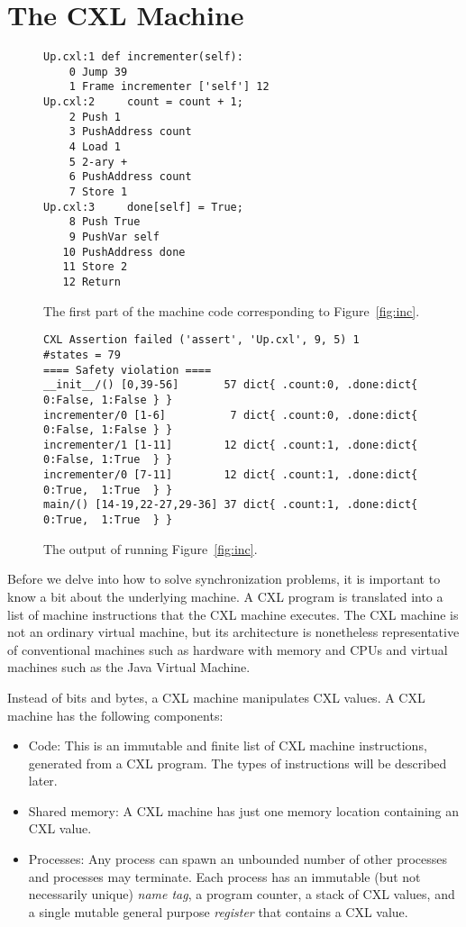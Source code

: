 \documentclass{report}
\newenvironment{code}{
\tcolorbox
}{
\endtcolorbox
}
\begin{document}
\chapter{The CXL Machine}
\label{ch:cxlmachine}

\begin{figure}
\begin{code}
\begin{verbatim}
Up.cxl:1 def incrementer(self):
    0 Jump 39
    1 Frame incrementer ['self'] 12
Up.cxl:2     count = count + 1;
    2 Push 1
    3 PushAddress count
    4 Load 1
    5 2-ary +
    6 PushAddress count
    7 Store 1
Up.cxl:3     done[self] = True;
    8 Push True
    9 PushVar self
   10 PushAddress done
   11 Store 2
   12 Return
\end{verbatim}
\end{code}
\caption{The first part of the machine code corresponding to Figure~\ref{fig:inc}.}
\label{fig:inccode}
\end{figure}

\begin{figure}
\begin{code}
\begin{verbatim}
CXL Assertion failed ('assert', 'Up.cxl', 9, 5) 1
#states = 79
==== Safety violation ====
__init__/() [0,39-56]       57 dict{ .count:0, .done:dict{ 0:False, 1:False } }
incrementer/0 [1-6]          7 dict{ .count:0, .done:dict{ 0:False, 1:False } }
incrementer/1 [1-11]        12 dict{ .count:1, .done:dict{ 0:False, 1:True  } }
incrementer/0 [7-11]        12 dict{ .count:1, .done:dict{ 0:True,  1:True  } }
main/() [14-19,22-27,29-36] 37 dict{ .count:1, .done:dict{ 0:True,  1:True  } }
\end{verbatim}
\end{code}
\caption{The output of running Figure~\ref{fig:inc}.}
\label{fig:incoutput}
\end{figure}

Before we delve into how to solve synchronization problems, it is important
to know a bit about the underlying machine.  A CXL program is translated
into a list of machine instructions that the CXL machine executes.
The CXL machine is not an ordinary virtual machine, but its architecture
is nonetheless representative of conventional machines such as hardware
with memory and CPUs and virtual machines such as the Java Virtual Machine.

Instead of bits and bytes, a CXL machine manipulates CXL values.
A CXL machine has the following components:
\begin{itemize}
\item Code:  This is an immutable and finite list of CXL machine instructions,
generated from a CXL program.  The types of instructions will be described later.
\item Shared memory: A CXL machine has just one memory location containing
an CXL value.
\item Processes:  Any process
can spawn an unbounded number of other processes and processes may terminate.
Each process has an immutable (but not necessarily unique) \emph{name tag},
a program counter, a stack of CXL values,
and a single mutable general purpose \emph{register} that contains a CXL value.
\end{itemize}
\end{document}
